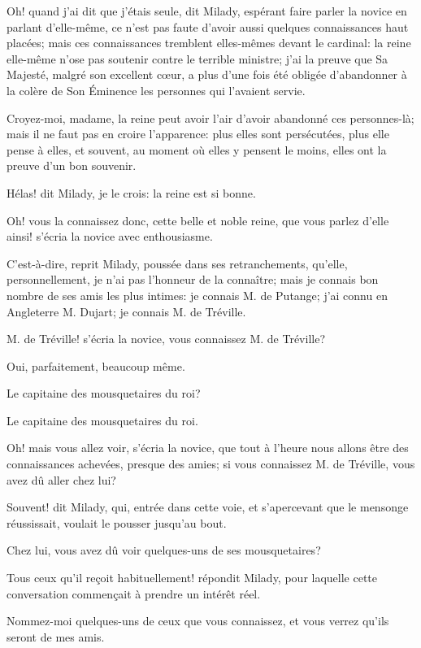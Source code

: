 \speak  Oh! quand j'ai dit que j'étais seule, dit Milady, espérant faire parler la novice en parlant d'elle-même, ce n'est pas faute d'avoir aussi quelques connaissances haut placées; mais ces connaissances tremblent elles-mêmes devant le cardinal: la reine elle-même n'ose pas soutenir contre le terrible ministre; j'ai la preuve que Sa Majesté, malgré son excellent cœur, a plus d'une fois été obligée d'abandonner à la colère de Son Éminence les personnes qui l'avaient servie. 

\speak  Croyez-moi, madame, la reine peut avoir l'air d'avoir abandonné ces personnes-là; mais il ne faut pas en croire l'apparence: plus elles sont persécutées, plus elle pense à elles, et souvent, au moment où elles y pensent le moins, elles ont la preuve d'un bon souvenir. 

\speak  Hélas! dit Milady, je le crois: la reine est si bonne. 

\speak  Oh! vous la connaissez donc, cette belle et noble reine, que vous parlez d'elle ainsi! s'écria la novice avec enthousiasme. 

\speak  C'est-à-dire, reprit Milady, poussée dans ses retranchements, qu'elle, personnellement, je n'ai pas l'honneur de la connaître; mais je connais bon nombre de ses amis les plus intimes: je connais M. de Putange; j'ai connu en Angleterre M. Dujart; je connais M. de Tréville. 

\speak  M. de Tréville! s'écria la novice, vous connaissez M. de Tréville? 

\speak  Oui, parfaitement, beaucoup même. 

\speak  Le capitaine des mousquetaires du roi? 

\speak  Le capitaine des mousquetaires du roi. 

\speak  Oh! mais vous allez voir, s'écria la novice, que tout à l'heure nous allons être des connaissances achevées, presque des amies; si vous connaissez M. de Tréville, vous avez dû aller chez lui? 

\speak  Souvent! dit Milady, qui, entrée dans cette voie, et s'apercevant que le mensonge réussissait, voulait le pousser jusqu'au bout. 

\speak  Chez lui, vous avez dû voir quelques-uns de ses mousquetaires? 

\speak  Tous ceux qu'il reçoit habituellement! répondit Milady, pour laquelle cette conversation commençait à prendre un intérêt réel. 

\speak  Nommez-moi quelques-uns de ceux que vous connaissez, et vous verrez qu'ils seront de mes amis. 

